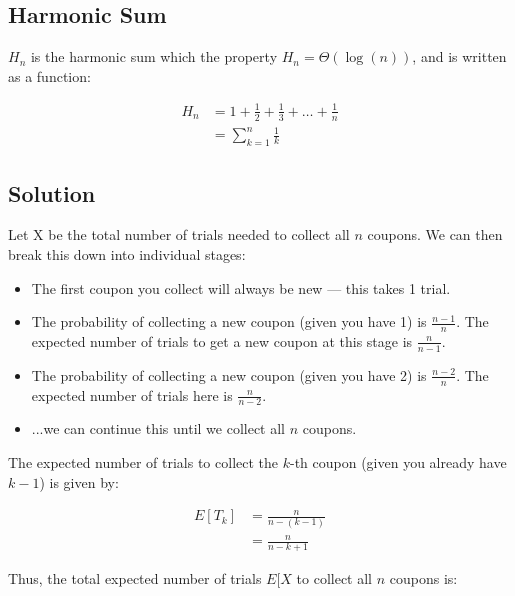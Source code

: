     \subsection*{Harmonic Sum}
        \(H_n\) is the harmonic sum which the property \(H_n = \Theta(\log(n))\), and is written as a function:

        \[
            \begin{aligned}
                H_n & = 1 + \frac{1}{2} + \frac{1}{3} + \dots + \frac{1}{n}\\
                & = \sum_{k = 1}^{n} \frac{1}{k}
            \end{aligned}
        \]

    \subsection*{Solution}
        Let X be the total number of trials needed to collect all \(n\) coupons. We can then break this down into individual stages:

        \begin{itemize}
            \item The first coupon you collect will always be new --- this takes 1 trial.

            \item The probability of collecting a new coupon (given you have 1) is \(\frac{n - 1}{n}\). The expected number of trials to get a new coupon at this stage is \(\frac{n}{n - 1}\).

            \item The probability of collecting a new coupon (given you have 2) is \(\frac{n - 2}{n}\). The expected number of trials here is \(\frac{n}{n - 2}\).

            \item ...we can continue this until we collect all \(n\) coupons.
        \end{itemize}

        The expected number of trials to collect the \(k\)-th coupon (given you already have \(k - 1\)) is given by:

        \[
            \begin{aligned}
                E[T_k] & = \frac{n}{n - (k - 1)}\\
                & = \frac{n}{n - k + 1}
            \end{aligned}
        \]

        Thus, the total expected number of trials \(E[X\) to collect all \(n\) coupons is:

